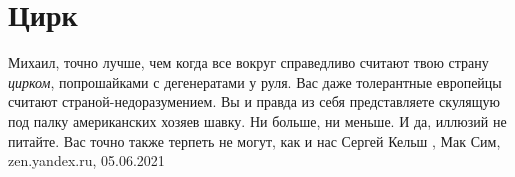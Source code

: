  
 
 
 
 
\chapter{Цирк}

Михаил, точно лучше, чем когда все вокруг справедливо считают твою страну
\emph{цирком}, попрошайками с дегенератами у руля. Вас даже толерантные
европейцы считают страной-недоразумением. Вы и правда из себя представляете
скулящую под палку американских хозяев шавку. Ни больше, ни меньше. И да,
иллюзий не питайте. Вас точно также терпеть не могут, как и нас
Сергей Кельш
, 
Мак Сим, zen.yandex.ru, 05.06.2021
